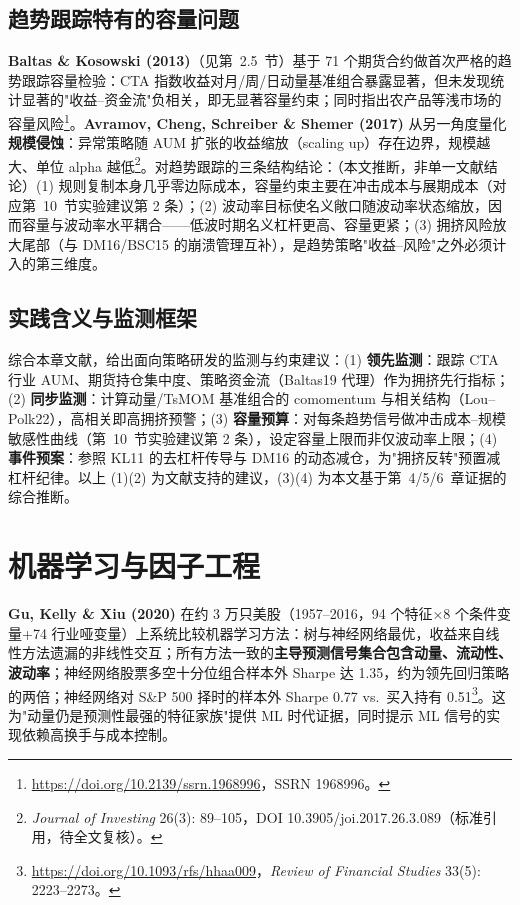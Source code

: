 \documentclass[11pt,a4paper]{article}
\begin{document}
\subsection{趋势跟踪特有的容量问题}
\textbf{Baltas \& Kosowski (2013)}（见第~2.5~节）基于 71 个期货合约做首次严格的趋势跟踪容量检验：CTA 指数收益对月/周/日动量基准组合暴露显著，但未发现统计显著的"收益--资金流"负相关，即无显著容量约束；同时指出农产品等浅市场的容量风险\footnote{\url{https://doi.org/10.2139/ssrn.1968996}，SSRN 1968996。}。\textbf{Avramov, Cheng, Schreiber \& Shemer (2017)} 从另一角度量化\textbf{规模侵蚀}：异常策略随 AUM 扩张的收益缩放（scaling up）存在边界，规模越大、单位 alpha 越低\footnote{\emph{Journal of Investing} 26(3): 89--105，DOI 10.3905/joi.2017.26.3.089（标准引用，待全文复核）。}。对趋势跟踪的三条结构结论：（本文推断，非单一文献结论）(1) 规则复制本身几乎零边际成本，容量约束主要在冲击成本与展期成本（对应第~10~节实验建议第 2 条）；(2) 波动率目标使名义敞口随波动率状态缩放，因而容量与波动率水平耦合——低波时期名义杠杆更高、容量更紧；(3) 拥挤风险放大尾部（与 DM16/BSC15 的崩溃管理互补），是趋势策略"收益--风险"之外必须计入的第三维度。

\subsection{实践含义与监测框架}
综合本章文献，给出面向策略研发的监测与约束建议：(1) \textbf{领先监测}：跟踪 CTA 行业 AUM、期货持仓集中度、策略资金流（Baltas19 代理）作为拥挤先行指标；(2) \textbf{同步监测}：计算动量/TsMOM 基准组合的 comomentum 与相关结构（Lou--Polk22），高相关即高拥挤预警；(3) \textbf{容量预算}：对每条趋势信号做冲击成本--规模敏感性曲线（第~10~节实验建议第 2 条），设定容量上限而非仅波动率上限；(4) \textbf{事件预案}：参照 KL11 的去杠杆传导与 DM16 的动态减仓，为"拥挤反转"预置减杠杆纪律。以上 (1)(2) 为文献支持的建议，(3)(4) 为本文基于第~4/5/6~章证据的综合推断。

\section{机器学习与因子工程}
\textbf{Gu, Kelly \& Xiu (2020)} 在约 3 万只美股（1957--2016，94 个特征$\times$8 个条件变量+74 行业哑变量）上系统比较机器学习方法：树与神经网络最优，收益来自线性方法遗漏的非线性交互；所有方法一致的\textbf{主导预测信号集合包含动量、流动性、波动率}；神经网络股票多空十分位组合样本外 Sharpe 达 1.35，约为领先回归策略的两倍；神经网络对 S\&P 500 择时的样本外 Sharpe 0.77 vs.\ 买入持有 0.51\footnote{\url{https://doi.org/10.1093/rfs/hhaa009}，\emph{Review of Financial Studies} 33(5): 2223--2273。}。这为"动量仍是预测性最强的特征家族"提供 ML 时代证据，同时提示 ML 信号的实现依赖高换手与成本控制。
\end{document}
